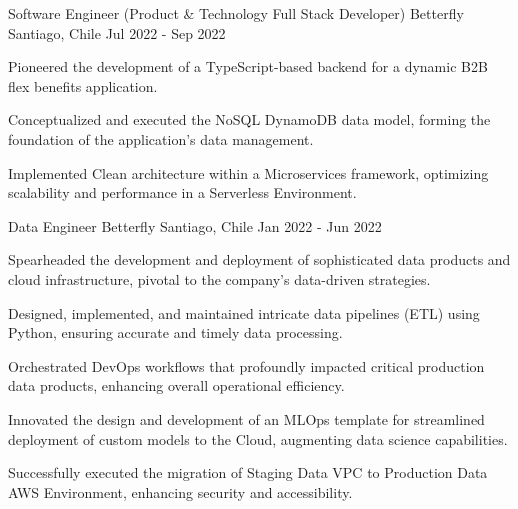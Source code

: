   \cventry
  {Software Engineer (Product \& Technology Full Stack Developer)}
  {Betterfly}
  {Santiago, Chile}
  {Jul 2022 - Sep 2022}
  {
  \begin{cvitems} %
    \item Pioneered the development of a TypeScript-based backend for a dynamic B2B flex benefits application.
    \item Conceptualized and executed the NoSQL DynamoDB data model, forming the foundation of the application's data management.
    \item Implemented Clean architecture within a Microservices framework, optimizing scalability and performance in a Serverless Environment.
  \end{cvitems}
  }

  \cventry
  {Data Engineer}
  {Betterfly}
  {Santiago, Chile}
  {Jan 2022 - Jun 2022}
  {
  \begin{cvitems} %
    \item Spearheaded the development and deployment of sophisticated data products and cloud infrastructure, pivotal to the company's data-driven strategies.
    \item Designed, implemented, and maintained intricate data pipelines (ETL) using Python, ensuring accurate and timely data processing.
    \item Orchestrated DevOps workflows that profoundly impacted critical production data products, enhancing overall operational efficiency.
    \item Innovated the design and development of an MLOps template for streamlined deployment of custom models to the Cloud, augmenting data science capabilities.
    \item Successfully executed the migration of Staging Data VPC to Production Data AWS Environment, enhancing security and accessibility.
  \end{cvitems}
  }
